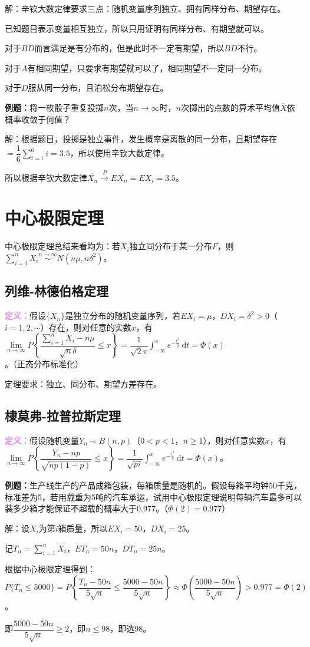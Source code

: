 \documentclass[UTF8, 12pt]{ctexart}
\begin{document}
解：辛钦大数定律要求三点：随机变量序列独立、拥有同样分布、期望存在。

已知题目表示变量相互独立，所以只用证明有同样分布、有期望就可以。

对于$BD$而言满足是有分布的，但是此时不一定有期望，所以$BD$不行。

对于$A$有相同期望，只要求有期望就可以了，相同期望不一定同一分布。

对于$D$服从同一分布，且泊松分布期望存在。

\textbf{例题：}将一枚骰子重复投掷$n$次，当$n\to\infty$时，$n$次掷出的点数的算术平均值$\overline{X}$依概率收敛于何值？

解：根据题目，投掷是独立事件，发生概率是离散的同一分布，且期望存在$=\dfrac{1}{6}\sum\limits_{i=1}^6i=3.5$，所以使用辛钦大数定律。

所以根据辛钦大数定律$\overline{X_n}\overset{P}{\rightarrow}E\overline{X_n}=EX_i=3.5$。

\section{中心极限定理}

中心极限定理总结来看均为：若$X_i$独立同分布于某一分布$F$，则$\sum\limits_{i=1}^nX_i\overset{n\to\infty}{\sim}N(n\mu,n\delta^2)$。

\subsection{列维-林德伯格定理}

\textcolor{violet}{\textbf{定义：}}假设$\{X_n\}$是独立分布的随机变量序列，若$EX_i=\mu$，$DX_i=\delta^2>0$（$i=1,2,\cdots$）存在，则对任意的实数$x$，有$\lim\limits_{n\to\infty}P\left\{\dfrac{\sum\limits_{i=1}^nX_i-n\mu}{\sqrt{n}\delta}\leqslant x\right\}=\dfrac{1}{\sqrt{2}\pi}\int_{-\infty}^xe^{-\frac{t^2}{2}}\,\textrm{d}t=\varPhi(x)$。（正态分布标准化）

定理要求：独立、同分布、期望方差存在。

\subsection{棣莫弗-拉普拉斯定理}

\textcolor{violet}{\textbf{定义：}}假设随机变量$Y_n\sim B(n,p)$（$0<p<1$，$n\geqslant1$），则对任意实数$x$，有$\lim\limits_{n\to\infty}P\left\{\dfrac{Y_n-np}{\sqrt{np(1-p)}}\leqslant x\right\}=\dfrac{1}{\sqrt{pi}}\int_{-\infty}^xe^{-\frac{t^2}{2}}\,\textrm{d}t=\varPhi(x)$。\medskip

\textbf{例题：}生产线生产的产品成箱包装，每箱质量是随机的。假设每箱平均钟50千克，标准差为5，若用载重为5吨的汽车承运，试用中心极限定理说明每辆汽车最多可以装多少箱才能保证不超载的概率大于0.977。（$\varPhi(2)=0.977$）

解：设$X_i$为第$i$箱质量，所以$EX_i=50$，$DX_i=25$。

记$T_n=\sum\limits_{i=1}^nX_i$，$ET_n=50n$，$DT_n=25n$。

根据中心极限定理得到：$P\{T_n\leqslant5000\}=P\left\{\dfrac{T_n-50n}{5\sqrt{n}}\leqslant\dfrac{5000-50n}{5\sqrt{n}}\right\}\approx\varPhi\left(\dfrac{5000-50n}{5\sqrt{n}}\right)>0.977=\varPhi(2)$。

即$\dfrac{5000-50n}{5\sqrt{n}}\geqslant2$，即$n\leqslant98$，即选98。
\end{document}

